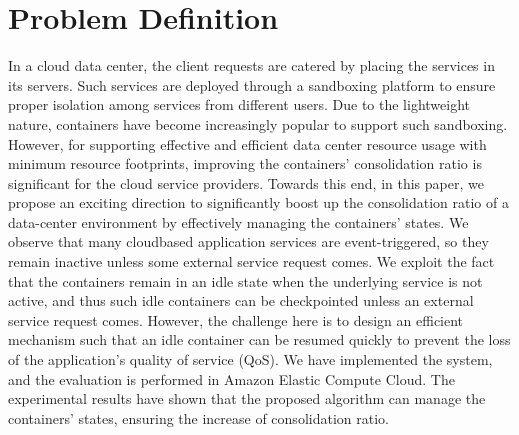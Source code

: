 \chapter{Problem Definition}

In a cloud data center, the client requests
are catered by placing the services in its servers. Such services are deployed through a sandboxing platform to ensure
proper isolation among services from different users. Due to
the lightweight nature, containers have become increasingly
popular to support such sandboxing. However, for supporting
effective and efficient data center resource usage with minimum
resource footprints, improving the containers’ consolidation ratio
is significant for the cloud service providers. Towards this end,
in this paper, we propose an exciting direction to significantly
boost up the consolidation ratio of a data-center environment
by effectively managing the containers’ states. We observe that
many cloudbased application services are event-triggered, so they
remain inactive unless some external service request comes. We
exploit the fact that the containers remain in an idle state when
the underlying service is not active, and thus such idle containers
can be checkpointed unless an external service request comes.
However, the challenge here is to design an efficient mechanism
such that an idle container can be resumed quickly to prevent
the loss of the application’s quality of service (QoS). We have
implemented the system, and the evaluation is performed in
Amazon Elastic Compute Cloud. The experimental results have
shown that the proposed algorithm can manage the containers’
states, ensuring the increase of consolidation ratio.
